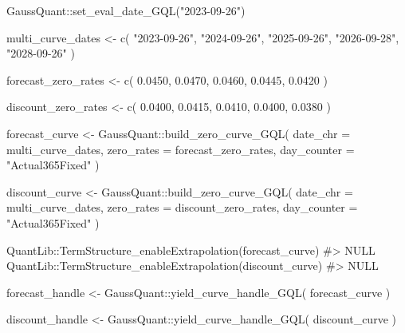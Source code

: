 \documentclass[
  letterpaper,
  DIV=11,
  numbers=noendperiod]{scrreprt}
\newenvironment{Shaded}{\begin{snugshade}}{\end{snugshade}}
\newcommand{\AttributeTok}[1]{\textcolor[rgb]{0.40,0.45,0.13}{#1}}
\newcommand{\CommentTok}[1]{\textcolor[rgb]{0.37,0.37,0.37}{#1}}
\newcommand{\FloatTok}[1]{\textcolor[rgb]{0.68,0.00,0.00}{#1}}
\newcommand{\FunctionTok}[1]{\textcolor[rgb]{0.28,0.35,0.67}{#1}}
\newcommand{\NormalTok}[1]{\textcolor[rgb]{0.00,0.23,0.31}{#1}}
\newcommand{\OtherTok}[1]{\textcolor[rgb]{0.00,0.23,0.31}{#1}}
\newcommand{\SpecialCharTok}[1]{\textcolor[rgb]{0.37,0.37,0.37}{#1}}
\newcommand{\StringTok}[1]{\textcolor[rgb]{0.13,0.47,0.30}{#1}}
\begin{document}
\begin{Shaded}
\begin{Highlighting}[]
\NormalTok{GaussQuant}\SpecialCharTok{::}\FunctionTok{set\_eval\_date\_GQL}\NormalTok{(}\StringTok{"2023{-}09{-}26"}\NormalTok{)}

\NormalTok{multi\_curve\_dates }\OtherTok{\textless{}{-}} \FunctionTok{c}\NormalTok{(}
  \StringTok{"2023{-}09{-}26"}\NormalTok{,}
  \StringTok{"2024{-}09{-}26"}\NormalTok{,}
  \StringTok{"2025{-}09{-}26"}\NormalTok{,}
  \StringTok{"2026{-}09{-}28"}\NormalTok{,}
  \StringTok{"2028{-}09{-}26"}
\NormalTok{)}

\NormalTok{forecast\_zero\_rates }\OtherTok{\textless{}{-}} \FunctionTok{c}\NormalTok{(}
  \FloatTok{0.0450}\NormalTok{,}
  \FloatTok{0.0470}\NormalTok{,}
  \FloatTok{0.0460}\NormalTok{,}
  \FloatTok{0.0445}\NormalTok{,}
  \FloatTok{0.0420}
\NormalTok{)}

\NormalTok{discount\_zero\_rates }\OtherTok{\textless{}{-}} \FunctionTok{c}\NormalTok{(}
  \FloatTok{0.0400}\NormalTok{,}
  \FloatTok{0.0415}\NormalTok{,}
  \FloatTok{0.0410}\NormalTok{,}
  \FloatTok{0.0400}\NormalTok{,}
  \FloatTok{0.0380}
\NormalTok{)}

\NormalTok{forecast\_curve }\OtherTok{\textless{}{-}}\NormalTok{ GaussQuant}\SpecialCharTok{::}\FunctionTok{build\_zero\_curve\_GQL}\NormalTok{(}
  \AttributeTok{date\_chr =}\NormalTok{ multi\_curve\_dates,}
  \AttributeTok{zero\_rates =}\NormalTok{ forecast\_zero\_rates,}
  \AttributeTok{day\_counter =} \StringTok{"Actual365Fixed"}
\NormalTok{)}

\NormalTok{discount\_curve }\OtherTok{\textless{}{-}}\NormalTok{ GaussQuant}\SpecialCharTok{::}\FunctionTok{build\_zero\_curve\_GQL}\NormalTok{(}
  \AttributeTok{date\_chr =}\NormalTok{ multi\_curve\_dates,}
  \AttributeTok{zero\_rates =}\NormalTok{ discount\_zero\_rates,}
  \AttributeTok{day\_counter =} \StringTok{"Actual365Fixed"}
\NormalTok{)}

\NormalTok{QuantLib}\SpecialCharTok{::}\FunctionTok{TermStructure\_enableExtrapolation}\NormalTok{(forecast\_curve)}
\CommentTok{\#\textgreater{} NULL}
\NormalTok{QuantLib}\SpecialCharTok{::}\FunctionTok{TermStructure\_enableExtrapolation}\NormalTok{(discount\_curve)}
\CommentTok{\#\textgreater{} NULL}

\NormalTok{forecast\_handle }\OtherTok{\textless{}{-}}\NormalTok{ GaussQuant}\SpecialCharTok{::}\FunctionTok{yield\_curve\_handle\_GQL}\NormalTok{(}
\NormalTok{  forecast\_curve}
\NormalTok{)}

\NormalTok{discount\_handle }\OtherTok{\textless{}{-}}\NormalTok{ GaussQuant}\SpecialCharTok{::}\FunctionTok{yield\_curve\_handle\_GQL}\NormalTok{(}
\NormalTok{  discount\_curve}
\NormalTok{)}


\end{Highlighting}
\end{Shaded}
\end{document}
